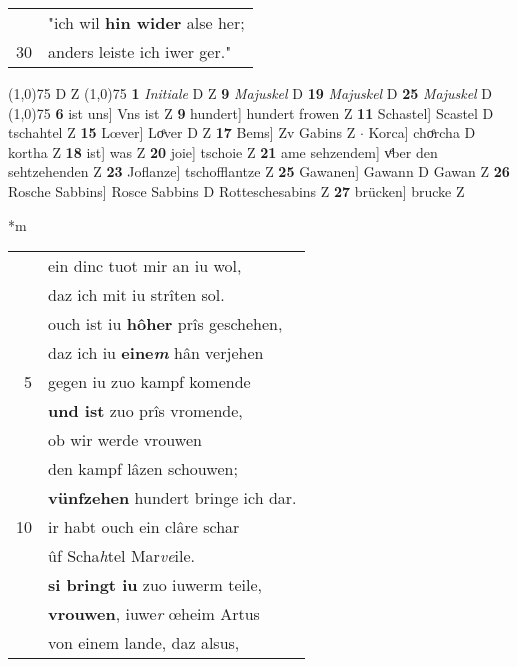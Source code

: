 \documentclass[8pt,a4paper,notitlepage]{article}
\begin{document}
\begin{table}[ht]
\begin{minipage}[t]{0.5\linewidth}
\begin{tabular}{rl}
 & "ich wil \textbf{hin wider} alse her;\\ 
30 & anders leiste ich iwer ger."\\ 
\end{tabular}
\scriptsize
\line(1,0){75} \newline
D Z \newline
\line(1,0){75} \newline
\textbf{1} \textit{Initiale} D Z  \textbf{9} \textit{Majuskel} D  \textbf{19} \textit{Majuskel} D  \textbf{25} \textit{Majuskel} D  \newline
\line(1,0){75} \newline
\textbf{6} ist uns] Vns ist Z \textbf{9} hundert] hundert frowen Z \textbf{11} Schastel] Scastel D tschahtel Z \textbf{15} Lœver] Loͤver D Z \textbf{17} Bems] Zv Gabins Z  $\cdot$ Korca] choͤrcha D kortha Z \textbf{18} ist] was Z \textbf{20} joie] tschoie Z \textbf{21} ame sehzendem] vͤber den sehtzehenden Z \textbf{23} Joflanze] tschofflantze Z \textbf{25} Gawanen] Gawann D Gawan Z \textbf{26} Rosche Sabbins] Rosce Sabbins D Rotteschesabins Z \textbf{27} brücken] brucke Z \newline
\end{minipage}
\hspace{0.5cm}
\begin{minipage}[t]{0.5\linewidth}
\small
\begin{center}*m
\end{center}
\begin{tabular}{rl}
 & ein dinc tuot mir an iu wol,\\ 
 & daz ich mit iu strîten sol.\\ 
 & ouch ist iu \textbf{hôher} prîs geschehen,\\ 
 & daz ich iu \textbf{eine\textit{m}} hân verjehen\\ 
5 & gegen iu zuo kampf komende\\ 
 & \textbf{und ist} zuo prîs vromende,\\ 
 & ob wir werde vrouwen\\ 
 & den kampf lâzen schouwen;\\ 
 & \textbf{vünfzehen} hundert bringe ich dar.\\ 
10 & ir habt ouch ein clâre schar\\ 
 & ûf Scha\textit{h}tel Mar\textit{ve}ile.\\ 
 & \textbf{si bringt iu} zuo iuwerm teile,\\ 
 & \textbf{vrouwen}, iuwe\textit{r} œheim Artus\\ 
 & von einem lande, daz alsus,\\ 

\end{tabular}
\end{minipage}
\end{table}
\end{document}
